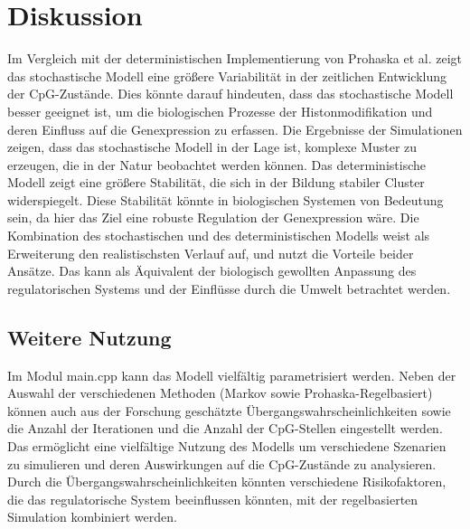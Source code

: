 \documentclass{SeminarV2}
\begin{document}
\section{Diskussion}
Im Vergleich mit der deterministischen Implementierung von Prohaska et al. zeigt das stochastische Modell eine größere Variabilität in der zeitlichen Entwicklung der CpG-Zustände. Dies könnte darauf hindeuten, dass das stochastische Modell besser geeignet ist, um die biologischen Prozesse der Histonmodifikation und deren Einfluss auf die Genexpression zu erfassen. Die Ergebnisse der Simulationen zeigen, dass das stochastische Modell in der Lage ist, komplexe Muster zu erzeugen, die in der Natur beobachtet werden können.
Das deterministische Modell zeigt eine größere Stabilität, die sich in der Bildung stabiler Cluster widerspiegelt. Diese Stabilität könnte in biologischen Systemen von Bedeutung sein, da hier das Ziel eine robuste Regulation der Genexpression wäre.
Die Kombination des stochastischen und des deterministischen Modells weist als Erweiterung den realistischsten Verlauf auf, und nutzt die Vorteile beider Ansätze. 
Das kann als Äquivalent der biologisch gewollten Anpassung des regulatorischen Systems und der Einflüsse durch die Umwelt betrachtet werden.

\subsection{Weitere Nutzung}
Im Modul main.cpp kann das Modell vielfältig parametrisiert werden. Neben der Auswahl der verschiedenen Methoden (Markov sowie Prohaska-Regelbasiert) können auch aus der Forschung geschätzte Übergangswahrscheinlichkeiten sowie die Anzahl der Iterationen und die Anzahl der CpG-Stellen eingestellt werden.
Das ermöglicht eine vielfältige Nutzung des Modells um verschiedene Szenarien zu simulieren und deren Auswirkungen auf die CpG-Zustände zu analysieren.
Durch die Übergangswahrscheinlichkeiten könnten verschiedene Risikofaktoren, die das regulatorische System beeinflussen könnten, mit der regelbasierten Simulation kombiniert werden.
\end{document}
